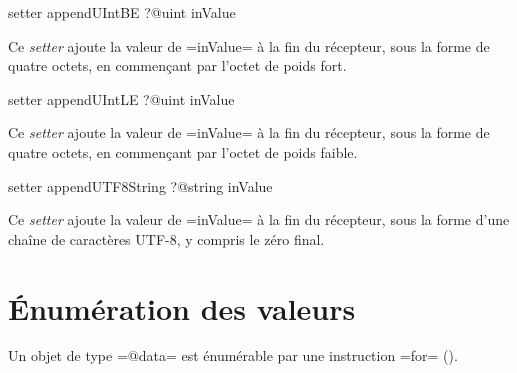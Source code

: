 
\begin{galgas3}
setter appendUIntBE ?@uint inValue
\end{galgas3}

Ce \emph{setter} ajoute la valeur de \ggst=inValue= à la fin du récepteur, sous la forme de quatre octets, en commençant par l'octet de poids fort.










\begin{galgas3}
setter appendUIntLE ?@uint inValue
\end{galgas3}

Ce \emph{setter} ajoute la valeur de \ggst=inValue= à la fin du récepteur, sous la forme de quatre octets, en commençant par l'octet de poids faible.












\begin{galgas3}
setter appendUTF8String ?@string inValue
\end{galgas3}

Ce \emph{setter} ajoute la valeur de \ggst=inValue= à la fin du récepteur, sous la forme d'une chaîne de caractères UTF-8, y compris le zéro final.


\section{Énumération des valeurs}

Un objet de type \ggst=@data= est énumérable par une instruction \ggst=for= ().
